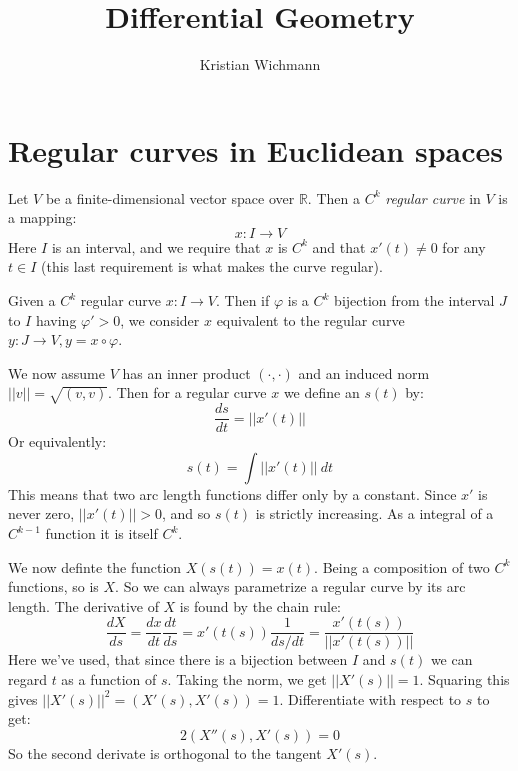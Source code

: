 \documentclass[12pt, a4paper]{article}
\title{Differential Geometry}
\author{Kristian Wichmann}
\numberwithin{equation}{section}
\begin{document}
\maketitle

\section{Regular curves in Euclidean spaces}
Let $V$ be a finite-dimensional vector space over $\mathbb{R}$. Then a $C^k$ \textit{regular curve} in $V$ is a mapping:
\begin{equation}
x: I\rightarrow V
\end{equation}
Here $I$ is an interval, and we require that $x$ is $C^k$ and that $x'(t)\neq 0$ for any $t\in I$ (this last requirement is what makes the curve regular).

Given a $C^k$ regular curve $x: I\rightarrow V$. Then if $\varphi$ is a $C^k$ bijection from the interval $J$ to $I$ having $\varphi'>0$, we consider $x$ equivalent to the regular curve $y: J\rightarrow V, y=x\circ\varphi$.

We now assume $V$ has an inner product $(\cdot,\cdot)$ and an induced norm $||v||=\sqrt{(v,v)}$. Then for a regular curve $x$ we define an  $s(t)$ by:
\begin{equation}
\frac{ds}{dt}=||x'(t)||
\end{equation}
Or equivalently:
\begin{equation}
s(t)=\int||x'(t)||\ dt
\end{equation}
This means that two arc length functions differ only by a constant. Since $x'$ is never zero, $||x'(t)||>0$, and so $s(t)$ is strictly increasing. As a integral of a $C^{k-1}$ function it is itself $C^k$.

We now definte the function $X(s(t))=x(t)$. Being a composition of two $C^k$ functions, so is $X$. So we can always parametrize a regular curve by its arc length. The derivative of $X$ is found by the chain rule:
\begin{equation}
\frac{dX}{ds}=\frac{dx}{dt}\frac{dt}{ds}=x'(t(s))\frac{1}{ds/dt}=\frac{x'(t(s))}{||x'(t(s))||}
\label{x_prime_s}
\end{equation}
Here we've used, that since there is a bijection between $I$ and $s(t)$ we can regard $t$ as a function of $s$. Taking the norm, we get $||X'(s)||=1$. Squaring this gives $||X'(s)||^2=(X'(s),X'(s))=1$. Differentiate with respect to $s$ to get:
\begin{equation}
2(X''(s),X'(s))=0
\end{equation}
So the second derivate is orthogonal to the tangent $X'(s)$.
\end{document}
